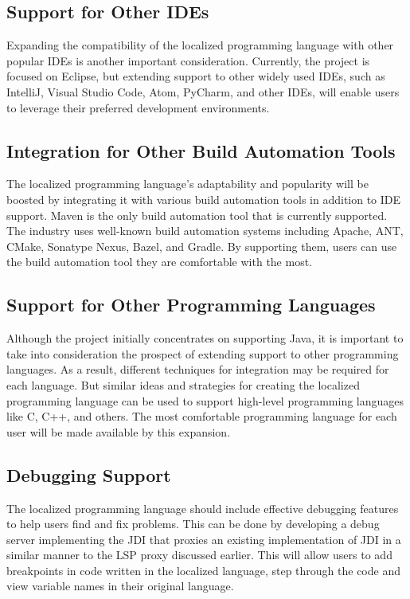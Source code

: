 \subsection{Support for Other IDEs}
Expanding the compatibility of the localized programming language with other popular IDEs is another important consideration. Currently, the project is focused on Eclipse, but extending support to other widely used IDEs, such as IntelliJ, Visual Studio Code, Atom, PyCharm, and other IDEs, will enable users to leverage their preferred development environments. 
\subsection{Integration for Other Build Automation Tools}
The localized programming language's adaptability and popularity will be boosted by integrating it with various build automation tools in addition to IDE support. Maven is the only build automation tool that is currently supported. The industry uses well-known build automation systems including Apache, ANT, CMake, Sonatype Nexus, Bazel, and Gradle. By supporting them, users can use the build automation tool they are comfortable with the most. 
\subsection{Support for Other Programming Languages}
Although the project initially concentrates on supporting Java, it is important to take into consideration the prospect of extending support to other programming languages. As a result, different techniques for integration may be required for each language. But similar ideas and strategies for creating the localized programming language can be used to support high-level programming languages like C, C++, and others. The most comfortable programming language for each user will be made available by this expansion.
\subsection{Debugging Support}
The localized programming language should include effective debugging features to help users find and fix problems. This can be done by developing a debug server implementing the \ac{JDI} that proxies an existing implementation of JDI in a similar manner to the LSP proxy discussed earlier. This will allow users to add breakpoints in code written in the localized language, step through the code and view variable names in their original language. 
